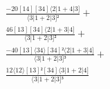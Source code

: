 \documentclass[varwidth, border=5pt]{standalone}
\begin{document}
\begin{my}
$\begin{gathered}
\scriptscriptstyle\frac{-20[14][34]⟨2|1+4|3]}{⟨3|1+2|3]²} +\\
\scriptscriptstyle\frac{46[13][34]⟨2|1+3|4]}{⟨3|1+2|3]²} +\\
\scriptscriptstyle\frac{-40[13]⟨34⟩[34]²⟨2|1+3|4]}{⟨3|1+2|3]³} +\\
\scriptscriptstyle\frac{12⟨12⟩[13]²[34]⟨3|1+2|4]}{⟨3|1+2|3]³} \phantom{+}
\end{gathered}$
\end{my}
\end{document}
